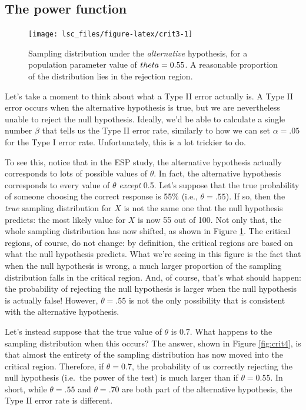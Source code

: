 \documentclass[
]{book}
\theoremstyle{definition}
\theoremstyle{definition}
\theoremstyle{definition}
\theoremstyle{definition}
\theoremstyle{remark}
\begin{document}
\hypertarget{the-power-function}{%
\subsection{The power function}\label{the-power-function}}



\begin{figure}

{\centering \texttt{[image: lsc\_files/figure-latex/crit3-1]} 

}

\caption{Sampling distribution under the \emph{alternative} hypothesis, for a population parameter value of \(\\theta = 0.55\). A reasonable proportion of the distribution lies in the rejection region.}\label{fig:crit3}
\end{figure}

Let's take a moment to think about what a Type II error actually is. A Type II error occurs when the alternative hypothesis is true, but we are nevertheless unable to reject the null hypothesis. Ideally, we'd be able to calculate a single number \(\beta\) that tells us the Type II error rate, similarly to how we can set \(\alpha = .05\) for the Type I error rate. Unfortunately, this is a lot trickier to do.

To see this, notice that in the ESP study, the alternative hypothesis actually corresponds to lots of possible values of \(\theta\). In fact, the alternative hypothesis corresponds to every value of \(\theta\) \emph{except} 0.5. Let's suppose that the true probability of someone choosing the correct response is 55\% (i.e., \(\theta = .55\)). If so, then the \emph{true} sampling distribution for \(X\) is not the same one that the null hypothesis predicts: the most likely value for \(X\) is now 55 out of 100. Not only that, the whole sampling distribution has now shifted, as shown in Figure \ref{fig:crit3}. The critical regions, of course, do not change: by definition, the critical regions are based on what the null hypothesis predicts. What we're seeing in this figure is the fact that when the null hypothesis is wrong, a much larger proportion of the sampling distribution falls in the critical region. And, of course, that's what should happen: the probability of rejecting the null hypothesis is larger when the null hypothesis is actually false! However, \(\theta = .55\) is not the only possibility that is consistent with the alternative hypothesis.

Let's instead suppose that the true value of \(\theta\) is 0.7. What happens to the sampling distribution when this occurs? The answer, shown in Figure \ref{fig:crit4}, is that almost the entirety of the sampling distribution has now moved into the critical region. Therefore, if \(\theta = 0.7\), the probability of us correctly rejecting the null hypothesis (i.e.~the power of the test) is much larger than if \(\theta = 0.55\). In short, while \(\theta = .55\) and \(\theta = .70\) are both part of the alternative hypothesis, the Type II error rate is different.
\end{document}
